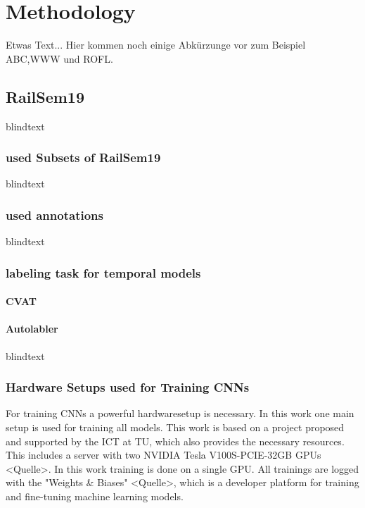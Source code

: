 \chapter{Methodology}
\label{sec:methodology}
Etwas Text... Hier kommen noch einige Abkürzunge vor zum Beispiel \ac{ABC},\ac{WWW} und \ac{ROFL}.

\section{RailSem19}
blindtext

\subsection{used Subsets of RailSem19}
blindtext

\subsection{used annotations}
blindtext

\subsection{labeling task for temporal models}

\subsubsection{CVAT}
\subsubsection{Autolabler}
blindtext

\subsection{Hardware Setups used for Training CNNs}

For training \ac{CNN}s a powerful hardwaresetup is necessary.
In this work one main setup is used for training all models.
This work is based on a project proposed and supported by the \ac{ICT} at \ac{TU}, which also provides the necessary resources.
This includes a server with two NVIDIA Tesla V100S-PCIE-32GB \ac{GPU}s <Quelle>.
In this work training is done on a single \ac{GPU}.
All trainings are logged with the "Weights \& Biases" <Quelle>, which is a developer platform for training and fine-tuning machine learning models.


